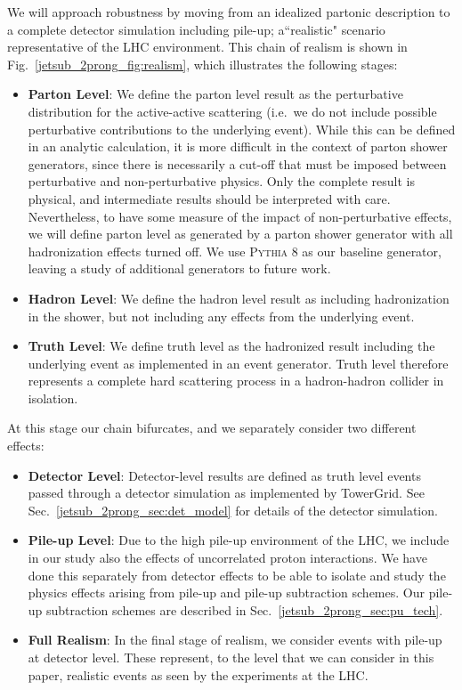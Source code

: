 \documentclass[11pt,letterpaper]{article}
\begin{document}
We will approach robustness by moving from an idealized partonic description to a complete detector simulation including pile-up; a``realistic" scenario representative of the LHC environment.
%
This chain of realism is shown in Fig.~\ref{jetsub_2prong_fig:realism}, which illustrates the following stages:
%
\begin{itemize}
\item {\bf Parton Level}: We define the parton level result as the
  perturbative distribution for the active-active scattering (i.e.\ we
  do not include possible perturbative contributions to the underlying
  event).
  While this can be defined in an analytic calculation, it is
  more difficult in the context of parton shower generators, since
  there is necessarily a cut-off that must be imposed between
  perturbative and non-perturbative physics.
  Only the complete result
  is physical, and intermediate results should be interpreted with
  care.
  Nevertheless, to have some measure of the impact of
  non-perturbative effects, we will define parton level as generated
  by a parton shower generator with all hadronization effects turned
  off.
  We use \textsc{Pythia 8} \cite{Sjostrand:2006za,Sjostrand:2007gs} as our baseline generator, leaving a study of additional generators to future work.
%
\item {\bf Hadron Level}: We define the hadron level result as including hadronization in the shower, but not including any effects from the underlying event.
%
\item {\bf Truth Level}:  We define truth level as the hadronized result including the underlying event as implemented in an event generator.
%
Truth level therefore represents a complete hard scattering process in a hadron-hadron collider in isolation.
%
\end{itemize}
At this stage our chain bifurcates, and we separately consider two different effects:
\begin{itemize}
\item {\bf Detector Level}: Detector-level results are defined as truth level events passed through a detector simulation as implemented by TowerGrid.  See Sec.~\ref{jetsub_2prong_sec:det_model} for details of the detector simulation.
%
\item {\bf Pile-up Level}: Due to the high pile-up environment of the LHC, we include in our study also the effects of uncorrelated proton interactions. We have done this separately from detector effects to be able to isolate and study the physics effects arising from pile-up and pile-up subtraction schemes. Our pile-up subtraction schemes are described in Sec.~\ref{jetsub_2prong_sec:pu_tech}.
%
\item {\bf Full Realism}: In the final stage of realism, we consider events with pile-up at detector
  level.
  These represent, to the level that we can consider in this
  paper, realistic events as seen by the experiments at the
  LHC.
\end{itemize}
\end{document}
